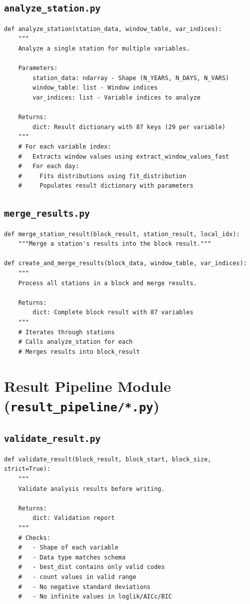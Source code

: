 ﻿\documentclass[12pt,a4paper]{report}
\begin{document}
\subsection{\texttt{analyze\_station.py}}
\begin{lstlisting}[caption=analyze\_station.py]
def analyze_station(station_data, window_table, var_indices):
    """
    Analyze a single station for multiple variables.
    
    Parameters:
        station_data: ndarray - Shape (N_YEARS, N_DAYS, N_VARS)
        window_table: list - Window indices
        var_indices: list - Variable indices to analyze
    
    Returns:
        dict: Result dictionary with 87 keys (29 per variable)
    """
    # For each variable index:
    #   Extracts window values using extract_window_values_fast
    #   For each day:
    #     Fits distributions using fit_distribution
    #     Populates result dictionary with parameters
\end{lstlisting}

\subsection{\texttt{merge\_results.py}}
\begin{lstlisting}[caption=merge\_results.py]
def merge_station_result(block_result, station_result, local_idx):
    """Merge a station's results into the block result."""

def create_and_merge_results(block_data, window_table, var_indices):
    """
    Process all stations in a block and merge results.
    
    Returns:
        dict: Complete block result with 87 variables
    """
    # Iterates through stations
    # Calls analyze_station for each
    # Merges results into block_result
\end{lstlisting}

\section{Result Pipeline Module (\texttt{result\_pipeline/*.py})}
\subsection{\texttt{validate\_result.py}}
\begin{lstlisting}[caption=validate\_result.py]
def validate_result(block_result, block_start, block_size, strict=True):
    """
    Validate analysis results before writing.
    
    Returns:
        dict: Validation report
    """
    # Checks:
    #   - Shape of each variable
    #   - Data type matches schema
    #   - best_dist contains only valid codes
    #   - count values in valid range
    #   - No negative standard deviations
    #   - No infinite values in loglik/AICc/BIC
\end{lstlisting}
\end{document}
